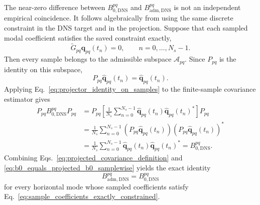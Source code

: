 \documentclass[11pt]{article}
\newcommand{\bfq}{\bm{q}}
\newcommand{\Gtilde}{\widetilde{G}}
\newcommand{\Bzero}{B_{0,\mathrm{DNS}}}
\newcommand{\Badm}{B_{\mathrm{adm},\mathrm{DNS}}}
\newcommand{\Pmat}{P}
\begin{document}
The near-zero difference between \(\Bzero^{pq}\) and \(\Badm^{pq}\) is not an
independent empirical coincidence. It follows algebraically from using the
same discrete constraint in the DNS target and in the projection. Suppose that
each sampled modal coefficient satisfies the saved constraint exactly,
\begin{equation}
  \Gtilde_{pq}\widehat{\bfq}_{pq}(t_n)=0,
  \qquad n=0,\ldots,N_s-1.
  \label{eq:sample_coefficients_exactly_constrained}
\end{equation}
Then every sample belongs to the admissible subspace
\(\mathcal{A}_{pq}\). Since \(\Pmat_{pq}\) is the identity on this subspace,
\begin{equation}
  \Pmat_{pq}\widehat{\bfq}_{pq}(t_n)
  =
  \widehat{\bfq}_{pq}(t_n).
  \label{eq:projector_identity_on_samples}
\end{equation}
Applying Eq.~\eqref{eq:projector_identity_on_samples} to the finite-sample
covariance estimator gives
\begin{align}
  \Pmat_{pq}\Bzero^{pq}\Pmat_{pq}
  &=
  \Pmat_{pq}
  \left[
  \frac{1}{N_s}
  \sum_{n=0}^{N_s-1}
  \widehat{\bfq}_{pq}(t_n)
  \widehat{\bfq}_{pq}(t_n)^*
  \right]
  \Pmat_{pq} \nonumber\\
  &=
  \frac{1}{N_s}
  \sum_{n=0}^{N_s-1}
  \left(\Pmat_{pq}\widehat{\bfq}_{pq}(t_n)\right)
  \left(\Pmat_{pq}\widehat{\bfq}_{pq}(t_n)\right)^* \nonumber\\
  &=
  \frac{1}{N_s}
  \sum_{n=0}^{N_s-1}
  \widehat{\bfq}_{pq}(t_n)
  \widehat{\bfq}_{pq}(t_n)^*
  =
  \Bzero^{pq}.
  \label{eq:b0_equals_projected_b0_samplewise}
\end{align}
Combining Eqs.~\eqref{eq:projected_covariance_definition} and
\eqref{eq:b0_equals_projected_b0_samplewise} yields the exact identity
\begin{equation}
  \Badm^{pq}=\Bzero^{pq}
  \label{eq:badm_equals_b0_exact}
\end{equation}
for every horizontal mode whose sampled coefficients satisfy
Eq.~\eqref{eq:sample_coefficients_exactly_constrained}.
\end{document}
